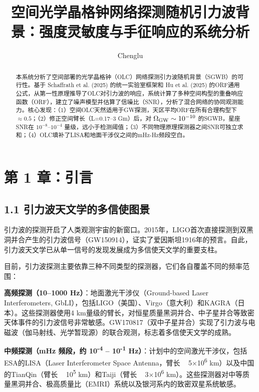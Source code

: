 \documentclass[12pt,a4paper]{article}
\begin{document}
\title{空间光学晶格钟网络探测随机引力波背景：强度灵敏度与手征响应的系统分析}
\author{Chenglu}
\date{}
\maketitle
\begin{abstract}
本系统分析了空间部署的光学晶格钟（OLC）网络探测引力波随机背景（SGWB）的可行性。基于 Schaffrath et al. (2025) 的统一实验室框架和 Hu et al. (2025) 的ORF通用公式，从第一性原理推导了OLC对引力波的响应，系统计算了多种空间构型的重叠响应函数（ORF），建立了噪声模型并估算了信噪比（SNR），分析了混合网络的协同观测能力。核心发现：（1）空间OLC天然适用于GW探测，天区平均ORF在所有合理构型下$\approx 0.5$；（2）修正空间臂长（L=0.17–3 Gm）后，对 $\Omega_{\rm GW} \sim 10^{-10}$ 的SGWB，星座SNR在 $10^{-8}$–$10^{-4}$ 量级，远小于检测阈值；（3）不同物理原理探测器之间SNR可独立求和；（4）OLC填补了LISA和地面干涉仪之间的mHz-Hz频段空白。
\end{abstract}

\section{第 1 章：引言}


\subsection{1.1 引力波天文学的多信使图景}


引力波的探测开启了人类观测宇宙的新窗口。2015年，LIGO首次直接探测到双黑洞并合产生的引力波信号（GW150914）\cite{ref1}，证实了爱因斯坦1916年的预言。自此，引力波天文学已从单一信号的发现发展成为多信使天文学的重要支柱。

目前，引力波探测主要依靠三种不同类型的探测器，它们各自覆盖不同的频率范围：

\textbf{高频探测（10–1000 Hz）}：地面激光干涉仪（Ground-based Laser Interferometers, GbLI），包括LIGO（美国）、Virgo（意大利）和KAGRA（日本）。这些探测器使用4 km量级的臂长，对恒星质量黑洞并合、中子星并合等致密天体事件的引力波信号非常敏感。GW170817（双中子星并合）实现了引力波与电磁波（伽马射线、光学暂现源）的联合观测，标志着多信使天文学的成熟\cite{ref2}。

\textbf{中频探测（mHz 频段，约 10\textsuperscript{-4} – 10\textsuperscript{-1} Hz）}：计划中的空间激光干涉仪，包括ESA的LISA（Laser Interferometer Space Antenna，臂长 ~ 5×10\textsuperscript{6} km）以及中国的TianQin（臂长 ~ 10\textsuperscript{5} km）和Taiji（臂长 ~ 3×10\textsuperscript{6} km）\cite{ref3}。这些探测器对中等质量黑洞并合、极高质量比（EMRI）系统以及银河系内的致密双星系统敏感。
\end{document}
